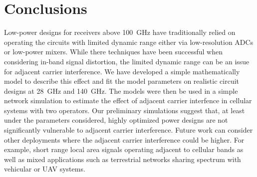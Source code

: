 \section{Conclusions} \label{sec:conclusion}

Low-power designs for receivers above \SI{100}{GHz}
have traditionally relied on operating the
circuits with limited dynamic range either
via low-resolution ADCs or low-power mixers.
While there techniques have been successful
when considering in-band signal distortion,
the limited dynamic range can be an issue for
adjacent carrier interference.  
We have developed a simple 
mathematically model to describe this effect 
and fit the model parameters on realistic 
circuit designs at \SI{28}{GHz} and \SI{140}{GHz}.
The models were then be used in a simple
network simulation to estimate the effect of
adjacent carrier interfence in cellular systems
with two operators.  Our preliminary simulations
suggest that, at least under the parameters
considered, highly optimized power designs
are not significantly vulnerable to adjacent
carrier interference.  Future work can consider
other deployments where the adjacent carrier
interference could be higher.  For example,
short range local area signals operating adjacent
to cellular bands as well as mixed applications
such as terrestrial networks sharing spectrum 
with vehicular or UAV systems.  